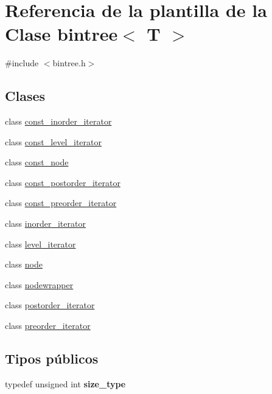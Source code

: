 \hypertarget{classbintree}{}\section{Referencia de la plantilla de la Clase bintree$<$ T $>$}
\label{classbintree}


{\ttfamily \#include $<$bintree.\+h$>$}

\subsection*{Clases}
\begin{DoxyCompactItemize}
\item 
class \hyperlink{classbintree_1_1const__inorder__iterator}{const\+\_\+inorder\+\_\+iterator}
\item 
class \hyperlink{classbintree_1_1const__level__iterator}{const\+\_\+level\+\_\+iterator}
\item 
class \hyperlink{classbintree_1_1const__node}{const\+\_\+node}
\item 
class \hyperlink{classbintree_1_1const__postorder__iterator}{const\+\_\+postorder\+\_\+iterator}
\item 
class \hyperlink{classbintree_1_1const__preorder__iterator}{const\+\_\+preorder\+\_\+iterator}
\item 
class \hyperlink{classbintree_1_1inorder__iterator}{inorder\+\_\+iterator}
\item 
class \hyperlink{classbintree_1_1level__iterator}{level\+\_\+iterator}
\item 
class \hyperlink{classbintree_1_1node}{node}
\item 
class \hyperlink{classbintree_1_1nodewrapper}{nodewrapper}
\item 
class \hyperlink{classbintree_1_1postorder__iterator}{postorder\+\_\+iterator}
\item 
class \hyperlink{classbintree_1_1preorder__iterator}{preorder\+\_\+iterator}
\end{DoxyCompactItemize}
\subsection*{Tipos públicos}
\begin{DoxyCompactItemize}
\item 
\hypertarget{classbintree_a267f374b5d239f2415552901c864179f}{}typedef unsigned int {\bfseries size\+\_\+type}\label{classbintree_a267f374b5d239f2415552901c864179f}

\end{DoxyCompactItemize}
